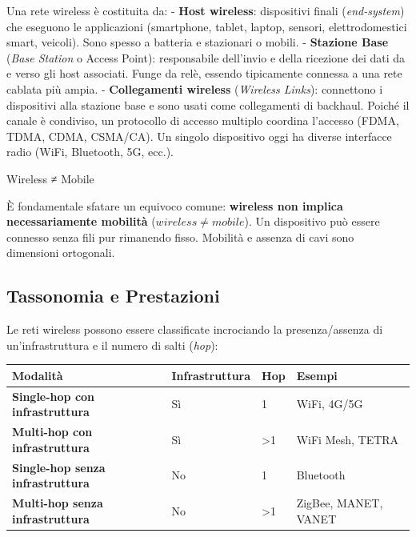 \documentclass[
  italian,
  openany]{book}
\newcounter{none} %
\begin{document}
Una rete wireless è costituita da: - \textbf{Host wireless}: dispositivi
finali (\emph{end-system}) che eseguono le applicazioni (smartphone,
tablet, laptop, sensori, elettrodomestici smart, veicoli). Sono spesso a
batteria e stazionari o mobili. - \textbf{Stazione Base} (\emph{Base
Station} o Access Point): responsabile dell'invio e della ricezione dei
dati da e verso gli host associati. Funge da relè, essendo tipicamente
connessa a una rete cablata più ampia. - \textbf{Collegamenti wireless}
(\emph{Wireless Links}): connettono i dispositivi alla stazione base e
sono usati come collegamenti di backhaul. Poiché il canale è condiviso,
un protocollo di accesso multiplo coordina l'accesso (FDMA, TDMA, CDMA,
CSMA/CA). Un singolo dispositivo oggi ha diverse interfacce radio (WiFi,
Bluetooth, 5G, ecc.).

\begin{calloutwarning}{Wireless ≠ Mobile}

È fondamentale sfatare un equivoco comune: \textbf{wireless non implica
necessariamente mobilità} (\(wireless \neq mobile\)). Un dispositivo può
essere connesso senza fili pur rimanendo fisso. Mobilità e assenza di
cavi sono dimensioni ortogonali.

\end{calloutwarning}

\subsection{Tassonomia e Prestazioni}\label{tassonomia-e-prestazioni}

Le reti wireless possono essere classificate incrociando la
presenza/assenza di un'infrastruttura e il numero di salti (\emph{hop}):

{\def\LTcaptype{none} %
\begin{longtable}[]{@{}llll@{}}
\toprule\noalign{}
Modalità & Infrastruttura & Hop & Esempi \\
\midrule\noalign{}
\endhead
\bottomrule\noalign{}
\endlastfoot
\textbf{Single-hop con infrastruttura} & Sì & 1 & WiFi, 4G/5G \\
\textbf{Multi-hop con infrastruttura} & Sì & \textgreater1 & WiFi Mesh,
TETRA \\
\textbf{Single-hop senza infrastruttura} & No & 1 & Bluetooth \\
\textbf{Multi-hop senza infrastruttura} & No & \textgreater1 & ZigBee,
MANET, VANET \\
\end{longtable}
}
\end{document}
